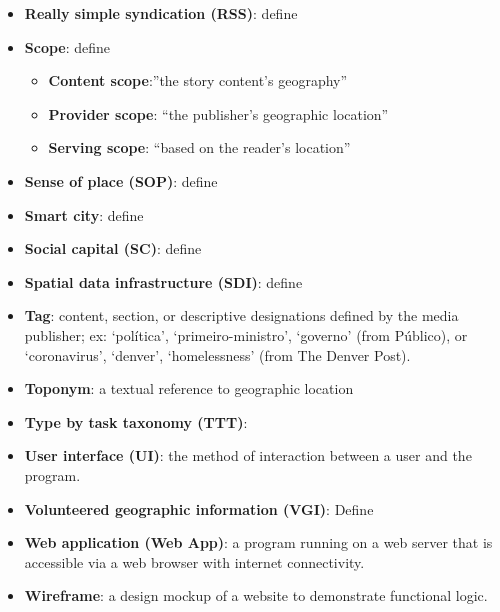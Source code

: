 \begin{itemize}
	\item[] \textbf{Really simple syndication (RSS)}:{\color{red} define}
	\item[] \textbf{Scope}: {\color{red}define}
	\begin{itemize}
		\item[] \textbf{Content scope}:{''the story content's geography''\cite{Teitler2008}}
		\item[] \textbf{Provider scope}: {``the publisher's geographic location''\cite{Teitler2008}}
		\item[] \textbf{Serving scope}: {``based on the reader's location''\cite{Teitler2008}}
	\end{itemize}
	\item[] \textbf{Sense of place (SOP)}: {\color{red} define}
	\item[] \textbf{Smart city}: {\color{red} define}
	\item[] \textbf{Social capital (SC)}: {\color{red} define} \cite{Acedo2019}
	\item[] \textbf{Spatial data infrastructure (SDI)}: {\color{red} define} \cite{Roche2012}
	\item[] \textbf{Tag}: content, section, or descriptive designations defined by the media publisher; ex: ‘política’, ‘primeiro-ministro’, ‘governo’ (from Público), or ‘coronavirus’, ‘denver’, ‘homelessness’ (from The Denver Post).
	\item[] \textbf{Toponym}: {a textual reference to geographic location \cite{Lieberman2010}}
	\item[] \textbf{Type by task taxonomy (TTT)}: {\cite{Schneiderman1996}}
	\item[] \textbf{User interface (UI)}: the method of interaction between a user and the program.
	\item[] \textbf{Volunteered geographic information (VGI)}: {\color{red} Define} \cite{Roche2012}
	\item[] \textbf{Web application (Web App)}: a program running on a web server that is accessible via a web browser with internet connectivity.
	\item[] \textbf{Wireframe}: a design mockup of a website to demonstrate functional logic.
\end{itemize}

\newpage

